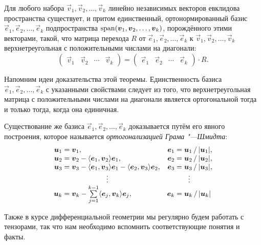 \begin{theorem}
	Для любого набора $\vec{v}_1, \vec{v}_2, \ldots, \vec{v}_k$ линейно независимых векторов евклидова пространства существует, и притом единственный, ортонормированный базис $\vec{e}_1, \vec{e}_2, \ldots, \vec{e}_k$ подпространства $\operatorname{span}(\boldsymbol{v}_1, \boldsymbol{v}_2, \ldots, \boldsymbol{v}_k)$, порождённого этими векторами, такой, что матрица перехода $R$ от $\vec{e}_1, \vec{e}_2, \ldots, \vec{e}_k$ к $\vec{v}_1, \vec{v}_2, \ldots, \vec{v}_k$ верхнетреугольная с положительными числами на диагонали:
	\[
		\begin{pmatrix}
			\vec{v}_1 & \vec{v}_2 & \cdots & \vec{v}_k
		\end{pmatrix} =
		\begin{pmatrix}
			\vec{e}_1 & \vec{e}_2 & \cdots & \vec{e}_k
		\end{pmatrix} \cdot R.
	\]
\end{theorem}

Напомним идеи доказательства этой теоремы. Единственность базиса $\vec{e}_1, \vec{e}_2, \ldots, \vec{e}_k$ с указанными свойствами следует из того, что верхнетреугольная матрица с положительными числами на диагонали является ортогональной тогда и только тогда, когда она единичная.

Существование же базиса $\vec{e}_1, \vec{e}_2, \ldots, \vec{e}_k$ доказывается путём его явного построения, которое называется \textit{ортогонализацией Грама "---Шмидта}:
\[
	\begin{array}{r@{\;}l@{\quad}r@{\;}l}
		\vec{u}_1 = & \vec{v}_1, & \vec{e}_1 = & \vec{u}_1\,/\,|\vec{u}_1|, \\
		\vec{u}_2 = & \vec{v}_2 - \langle \vec{e}_1, \vec{v}_2 \rangle \vec{e}_1, & \vec{e}_2 = & \vec{u}_2\,/\,|\vec{u}_2|, \\
		\vec{u}_3 = & \vec{v}_3 - \langle \vec{e}_1, \vec{v}_3 \rangle \vec{e}_1 - \langle \vec{e}_2, \vec{v}_3 \rangle \vec{e}_2, & \vec{e}_3 = & \vec{u}_3\,/\,|\vec{u}_3|, \\
			& \hspace{1.7cm} \vdots & & \hspace{.2cm} \vdots \\
		\vec{u}_k = & \vec{v}_k - \sum\limits_{j=1}^{k-1} \langle \vec{e}_j, \vec{v}_k \rangle \vec{e}_j, & \vec{e}_k = & \vec{u}_k\,/\,|\vec{u}_k|
	\end{array}
\]

Также в курсе дифференциальной геометрии мы регулярно будем работать с тензорами, так что нам необходимо вспомнить соответствующие понятия и факты.

